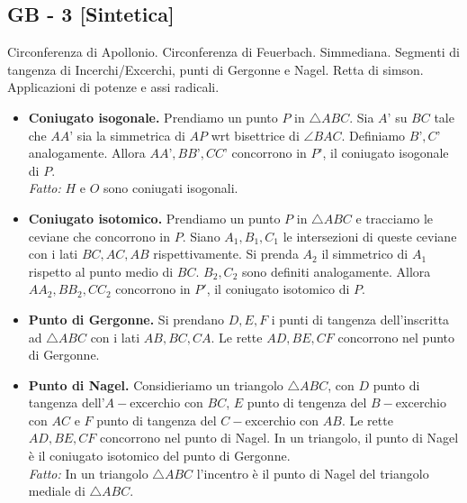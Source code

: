 \subsection{GB - 3 [Sintetica]}
\begin{short}
 Circonferenza di Apollonio. Circonferenza di Feuerbach. Simmediana. Segmenti di tangenza di Incerchi/Excerchi, punti di Gergonne e Nagel. Retta di simson. Applicazioni di potenze e assi radicali. 
\end{short}

\begin{itemize}

\item \textbf{Coniugato isogonale.} Prendiamo un punto $P$ in $\triangle ABC$. Sia $A’$ su $BC$ tale che $AA’$ sia la simmetrica di $AP$ wrt bisettrice di $\angle BAC$. Definiamo $B’,C’$ analogamente. Allora $AA’,BB’,CC’$ concorrono in $P’$, il coniugato isogonale di $P$.\\
\textit{Fatto:} $H$ e $O$ sono coniugati isogonali.\\

\item \textbf{Coniugato isotomico.} Prendiamo un punto $P$ in $\triangle ABC$ e tracciamo le ceviane che concorrono in $P$. Siano $A_1,B_1,C_1$ le intersezioni di queste ceviane con i lati $BC,AC,AB$ rispettivamente. Si prenda $A_2$ il simmetrico di $A_1$ rispetto al punto medio di $BC$. $B_2,C_2$ sono definiti analogamente. Allora $AA_2,BB_2,CC_2$ concorrono in $P'$, il coniugato isotomico di $P$.\\

\item \textbf{Punto di Gergonne.} Si prendano $D,E,F$ i punti di tangenza dell'inscritta ad $\triangle ABC$ con i lati $AB,BC,CA$. Le rette $AD,BE,CF$ concorrono nel punto di Gergonne. 

\item \textbf{Punto di Nagel.} Considieriamo un triangolo $\triangle ABC$, con $D$ punto di tangenza dell'$A-$excerchio con $BC$, $E$ punto di tengenza del $B-$excerchio con $AC$ e $F$ punto di tangenza del $C-$excerchio con $AB$. Le rette $AD,BE,CF$ concorrono nel punto di Nagel. In un triangolo, il punto di Nagel è il coniugato isotomico del punto di Gergonne. \\
\textit{Fatto:} In un triangolo $\triangle ABC$ l'incentro è il punto di Nagel del triangolo mediale di $\triangle ABC$.\\


\end{itemize}
